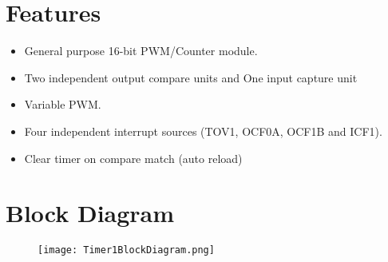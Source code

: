 \documentclass{article}
\begin{document}

\section{Features}
\begin{itemize}
    \item General purpose 16-bit PWM/Counter module.
    \item Two independent output compare units and One input capture unit
    \item Variable PWM.
    \item Four independent interrupt sources (TOV1, OCF0A, OCF1B and ICF1).
    \item Clear timer on compare match (auto reload)
\end{itemize}

\section{Block Diagram}
\begin{figure}[H]
    \begin{center}
        \texttt{[image: Timer1BlockDiagram.png]}
    \end{center}
\end{figure}
\end{document}
